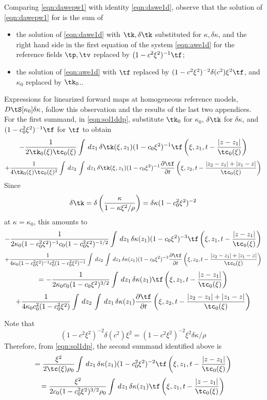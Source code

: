 Comparing \ref{eqn:dawepw1} with identity
\ref{eqn:dawe1d}, observe that the solution of \ref{eqn:dawepw1} for is
the sum of
\begin{itemize}
\item the solution of \ref{eqn:dawe1d} with $\tk, \delta \tk$
  substituted for $\kappa, \delta \kappa$, and the right hand side in
  the first equation of the system \ref{eqn:awe1d} for
  the reference fields $\tp, \tv$ replaced by $(1-c^2\xi^2)^{-1}\tf$;
\item the solution of \ref{eqn:awe1d} with $\tf$ replaced by
  $(1-c^2\xi^2)^{-2}\delta (c^2)\xi^2\tf$, and $\kappa_0$ replaced by $\tk_0$..
\end{itemize}

Expressions for linearized forward maps at homogeneous reference
models, $D\tS[\kappa_0]\delta \kappa$, follow this observation and the
results of the last two appendices. For the first summand, in
\ref{eqn:sol1ddp}, substitute $\tk_0$ for $\kappa_0$, $\delta \tk$ for
$\delta \kappa$, and $(1-c_0^2\xi^2)^{-1}\tf$ for $\tf$ to obtain
\[
-\frac{1}{2\tk_0(\xi)\tc_0(\xi)} \int \,dz_1\, \delta 
\tk(\xi,z_1)(1-c_0\xi^2)^{-1} \tf \left(\xi,z_1,t - \frac{|z-z_1|}{\tc_0(\xi)}\right)
\]
\[
  + \frac{1}{4\tk_0(\xi)\tc_0(\xi)^2} \int\,dz_2 \, \int \,dz_1\,\delta 
  \tk(\xi,z_1) (1-c_0\xi^2)^{-1}\frac{\partial \tf}{\partial t}\left(\xi,z_2,t - \frac{|z_2-z_1|+|z_1-z|}{\tc_0(\xi)}\right) 
\]
Since
\[
\delta \tk = \delta \left(\frac{\kappa}{1-\kappa \xi^2/\rho}\right) = \delta \kappa (1-c_0^2\xi^2)^{-2}
\]
at $\kappa=\kappa_0$,
this amounts to
\[
-\frac{1}{2\kappa_0(1-c_0^2\xi^2)^{-1}c_0(1-c_0^2\xi^2)^{-1/2}} \int \,dz_1\, \delta 
\kappa(z_1)(1-c_0\xi^2)^{-3} \tf \left(\xi,z_1,t - \frac{|z-z_1|}{\tc_0(\xi)}\right)
\]
\[
  + \frac{1}{4\kappa_0(1-c_0^2\xi^2)^{-1}c_0^2(1-c_0^2\xi^2)^{-1}} \int\,dz_2 \, \int \,dz_1\,\delta 
  \kappa(z_1) (1-c_0\xi^2)^{-3}\frac{\partial \tf}{\partial t}\left(\xi,z_2,t - \frac{|z_2-z_1|+|z_1-z|}{\tc_0(\xi)}\right) 
\]
\[
=  -\frac{1}{2\kappa_0c_0 (1-c_0\xi^2)^{3/2}} \int \,dz_1\, \delta 
\kappa(z_1) \tf \left(\xi,z_1,t - \frac{|z-z_1|}{\tc_0(\xi)}\right) 
\]
\begin{equation}
  \label{eqn:solpwdp1}
  + \frac{1}{4\kappa_0c_0^2(1-c_0^2\xi^2)} \int\,dz_2 \, \int \,dz_1\,\delta 
  \kappa(z_1) \frac{\partial \tf}{\partial t}\left(\xi,z_2,t - \frac{|z_2-z_1|+|z_1-z|}{\tc_0(\xi)}\right) 
\end{equation}

Note that
\[
  (1-c^2\xi^2)^{-2}\delta (c^2)\xi^2= (1-c^2\xi^2)^{-2}\xi^2\delta \kappa
  /\rho
\]
Therefore, from \ref{eqn:sol1dp}, the second summand identified above
is
\[
  =\frac{\xi^2}{2\tc(\xi)\rho_0}\int \,dz_1\, \delta 
\kappa(z_1)(1-c_0^2\xi^2)^{-2} \tf \left(\xi,z_1,t - \frac{|z-z_1|}{\tc_0(\xi)}\right)
\]
\[
  = \frac{\xi^2}{2c_0(1-c_0^2\xi^2)^{3/2}\rho_0}\int \,dz_1\, \delta 
\kappa(z_1) \tf \left(\xi,z_1,t - \frac{|z-z_1|}{\tc_0(\xi)}\right)
\]

